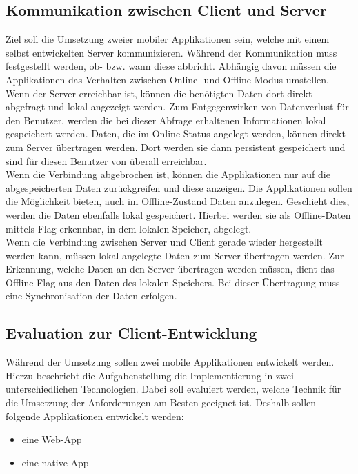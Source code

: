 \subsection{Kommunikation zwischen Client und Server}
\label{ssec:kommunikation-client-server}
Ziel soll die Umsetzung zweier mobiler Applikationen sein, welche mit einem selbst entwickelten Server kommunizieren. Während der Kommunikation muss festgestellt werden, ob- bzw. wann diese abbricht. Abhängig davon müssen die Applikationen das Verhalten zwischen Online- und Offline-Modus umstellen. \\
Wenn der Server erreichbar ist, können die benötigten Daten dort direkt abgefragt und lokal angezeigt werden. Zum Entgegenwirken von Datenverlust für den Benutzer, werden die bei dieser Abfrage erhaltenen Informationen lokal gespeichert werden. Daten, die im Online-Status angelegt werden, können direkt zum Server übertragen werden. Dort werden sie dann persistent gespeichert und sind für diesen Benutzer von überall erreichbar.\\
Wenn die Verbindung abgebrochen ist, können die Applikationen nur auf die abgespeicherten Daten zurückgreifen und diese anzeigen. Die Applikationen sollen die Möglichkeit bieten, auch im Offline-Zustand Daten anzulegen. Geschieht dies, werden die Daten ebenfalls lokal gespeichert. Hierbei werden sie als Offline-Daten mittels Flag erkennbar, in dem lokalen Speicher, abgelegt.\\
Wenn die Verbindung zwischen Server und Client gerade wieder hergestellt werden kann, müssen lokal angelegte Daten zum Server übertragen werden. Zur Erkennung, welche Daten an den Server übertragen werden müssen, dient das Offline-Flag aus den Daten des lokalen Speichers. Bei dieser Übertragung muss eine Synchronisation der Daten erfolgen. 
\subsection{Evaluation zur Client-Entwicklung}
\label{ssec:evaluation-client-entwicklung}
Während der Umsetzung sollen zwei mobile Applikationen entwickelt werden.  Hierzu beschriebt die Aufgabenstellung die Implementierung in zwei unterschiedlichen Technologien. Dabei soll evaluiert werden, welche Technik für die Umsetzung der Anforderungen am Besten geeignet ist. Deshalb sollen folgende Applikationen entwickelt werden: 
\begin{itemize}
\item eine \ac{Web-App}
\item eine native \gls{App} 
\end{itemize}
